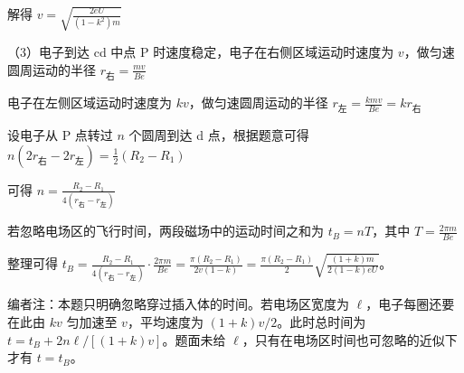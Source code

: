 \documentclass[\gkver]{gaokaozhenti}
\begin{document}
\begin{enumerate}
{解得 $v = \sqrt{\frac{2eU}{(1 - k^{2})m}}$

（3）电子到达 cd 中点 P 时速度稳定，电子在右侧区域运动时速度为 $v$，做匀速圆周运动的半径 $r_{\text{右}} = \frac{mv}{Be}$

电子在左侧区域运动时速度为 $kv$，做匀速圆周运动的半径 $r_{\text{左}} = \frac{kmv}{Be} = kr_{\text{右}}$

设电子从 P 点转过 $n$ 个圆周到达 d 点，根据题意可得 $n(2r_{\text{右}} - 2r_{\text{左}}) = \frac{1}{2}(R_{2} - R_{1})$

可得 $n = \frac{R_{2} - R_{1}}{4(r_{\text{右}} - r_{\text{左}})}$

若忽略电场区的飞行时间，两段磁场中的运动时间之和为 $t_{B} = nT$，其中 $T = \frac{2\pi m}{Be}$

整理可得 $t_{B} = \frac{R_{2} - R_{1}}{4(r_{\text{右}} - r_{\text{左}})} \cdot \frac{2\pi m}{Be} = \frac{\pi(R_{2} - R_{1})}{2v(1 - k)} = \frac{\pi(R_{2} - R_{1})}{2}\sqrt{\frac{(1 + k)m}{2(1 - k)eU}}$。

编者注：本题只明确忽略穿过插入体的时间。若电场区宽度为 $\ell$，电子每圈还要在此由 $kv$ 匀加速至 $v$，平均速度为 $(1+k)v/2$。此时总时间为 $t=t_{B}+2n\ell/[(1+k)v]$。题面未给 $\ell$，只有在电场区时间也可忽略的近似下才有 $t=t_{B}$。
}

\end{enumerate}
\end{document}
